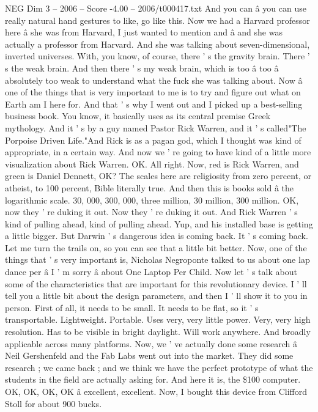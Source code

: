 \begin{textsample}{NEG Dim 3 – 2006 – Score -4.00 – 2006/t000417.txt}
And you can â you can use really natural hand gestures to like, go like this.
Now we had a Harvard professor here â she was from Harvard, I just wanted to mention and â and she was actually a professor from Harvard.
And she was talking about seven-dimensional, inverted universes.
With, you know, of course, there ' s the gravity brain.
There ' s the weak brain.
And then there ' s my weak brain, which is too â too â absolutely too weak to understand what the fuck she was talking about.
Now â one of the things that is very important to me is to try and figure out what on Earth am I here for.
And that ' s why I went out and I picked up a best-selling business book.
You know, it basically uses as its central premise Greek mythology.
And it ' s by a guy named Pastor Rick Warren, and it ' s called"The Porpoise Driven Life."And Rick is as a pagan god, which I thought was kind of appropriate, in a certain way.
And now we ' re going to have kind of a little more visualization about Rick Warren.
OK.
All right.
Now, red is Rick Warren, and green is Daniel Dennett, OK?
The scales here are religiosity from zero percent, or atheist, to 100 percent, Bible literally true.
And then this is books sold â the logarithmic scale. 30, 000, 300, 000, three million, 30 million, 300 million.
OK, now they ' re duking it out.
Now they ' re duking it out.
And Rick Warren ' s kind of pulling ahead, kind of pulling ahead.
Yup, and his installed base is getting a little bigger.
But Darwin ' s dangerous idea is coming back.
It ' s coming back.
Let me turn the trails on, so you can see that a little bit better.
Now, one of the things that ' s very important is, Nicholas Negroponte talked to us about one lap dance per â I ' m sorry â about One Laptop Per Child.
Now let ' s talk about some of the characteristics that are important for this revolutionary device.
I ' ll tell you a little bit about the design parameters, and then I ' ll show it to you in person.
First of all, it needs to be small.
It needs to be flat, so it ' s transportable.
Lightweight.
Portable.
Uses very, very little power.
Very, very high resolution.
Has to be visible in bright daylight.
Will work anywhere.
And broadly applicable across many platforms.
Now, we ' ve actually done some research â Neil Gershenfeld and the Fab Labs went out into the market.
They did some research ; we came back ; and we think we have the perfect prototype of what the students in the field are actually asking for.
And here it is, the \$100 computer.
OK, OK, OK, OK â excellent, excellent.
Now, I bought this device from Clifford Stoll for about 900 bucks.

\end{textsample}
